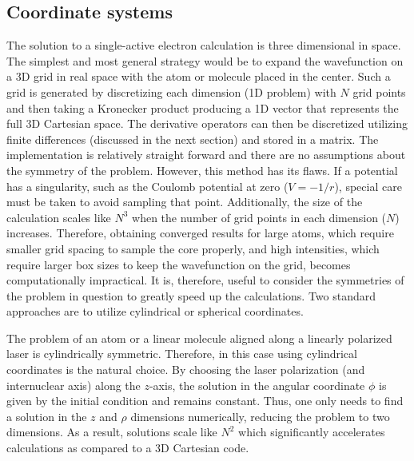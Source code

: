 \subsection{Coordinate systems} %
\label{sub:coordinate_systems}
The solution to a single-active electron calculation is three dimensional in space. The simplest and most general strategy would be to expand the wavefunction on a 3D grid in real space with the atom or molecule placed in the center. Such a grid is generated by discretizing each dimension (1D problem) with $N$ grid points and then taking a Kronecker product producing a 1D vector that represents the full 3D Cartesian space. The derivative operators can then be discretized utilizing finite differences (discussed in the next section) and stored in a matrix. The implementation is relatively straight forward and there are no assumptions about the symmetry of the problem. However, this method has its flaws. If a potential has a singularity, such as the Coulomb potential at zero ($V=-1/r$), special care must be taken to avoid sampling that point. Additionally, the size of the calculation scales like $N^3$ when the number of grid points in each dimension ($N$) increases. Therefore, obtaining converged results for large atoms, which require smaller grid spacing to sample the core properly, and high intensities, which require larger box sizes to keep the wavefunction on the grid, becomes computationally impractical. 
It is, therefore, useful to consider the symmetries of the problem in question to greatly speed up the calculations. Two standard approaches are to utilize cylindrical or spherical coordinates. 

The problem of an atom or a linear molecule aligned along a linearly polarized laser is cylindrically symmetric. Therefore, in this case using cylindrical coordinates is the natural choice. By choosing the laser polarization (and internuclear axis) along the $z$-axis, the solution in the angular coordinate $\phi$ is given by the initial condition and remains constant. Thus, one only needs to find a solution in the $z$ and $\rho$ dimensions numerically, reducing the problem to two dimensions. As a result, solutions scale like $N^2$ which significantly accelerates calculations as compared to a 3D Cartesian code. 

